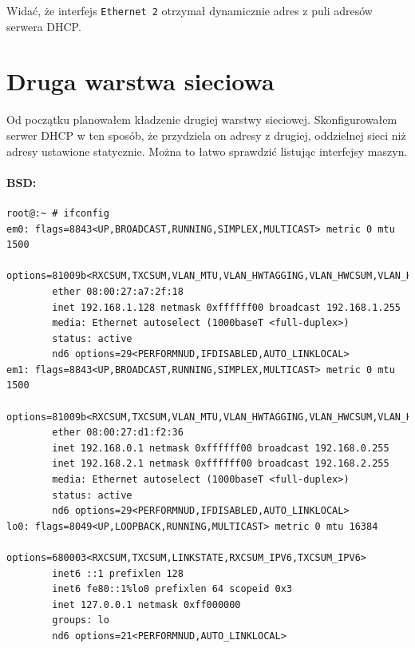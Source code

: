 \documentclass{mwart} %
\begin{document}
Widać, że interfejs \texttt{Ethernet 2} otrzymał dynamicznie adres z puli adresów serwera DHCP.
 
\section{Druga warstwa sieciowa}
Od początku planowałem kładzenie drugiej warstwy sieciowej. Skonfigurowałem serwer DHCP w ten sposób, że przydziela on adresy z drugiej, oddzielnej sieci niż adresy ustawione statycznie. Można to łatwo sprawdzić listując interfejsy maszyn.

\paragraph{BSD:}
\begin{verbatim}
root@:~ # ifconfig  
em0: flags=8843<UP,BROADCAST,RUNNING,SIMPLEX,MULTICAST> metric 0 mtu 1500 
        options=81009b<RXCSUM,TXCSUM,VLAN_MTU,VLAN_HWTAGGING,VLAN_HWCSUM,VLAN_HWFILTER>
        ether 08:00:27:a7:2f:18
        inet 192.168.1.128 netmask 0xffffff00 broadcast 192.168.1.255
        media: Ethernet autoselect (1000baseT <full-duplex>)
        status: active
        nd6 options=29<PERFORMNUD,IFDISABLED,AUTO_LINKLOCAL>
em1: flags=8843<UP,BROADCAST,RUNNING,SIMPLEX,MULTICAST> metric 0 mtu 1500
        options=81009b<RXCSUM,TXCSUM,VLAN_MTU,VLAN_HWTAGGING,VLAN_HWCSUM,VLAN_HWFILTER>
        ether 08:00:27:d1:f2:36
        inet 192.168.0.1 netmask 0xffffff00 broadcast 192.168.0.255
        inet 192.168.2.1 netmask 0xffffff00 broadcast 192.168.2.255
        media: Ethernet autoselect (1000baseT <full-duplex>)
        status: active
        nd6 options=29<PERFORMNUD,IFDISABLED,AUTO_LINKLOCAL>
lo0: flags=8049<UP,LOOPBACK,RUNNING,MULTICAST> metric 0 mtu 16384
        options=680003<RXCSUM,TXCSUM,LINKSTATE,RXCSUM_IPV6,TXCSUM_IPV6>
        inet6 ::1 prefixlen 128
        inet6 fe80::1%lo0 prefixlen 64 scopeid 0x3
        inet 127.0.0.1 netmask 0xff000000
        groups: lo
        nd6 options=21<PERFORMNUD,AUTO_LINKLOCAL>
\end{verbatim}
\end{document}
